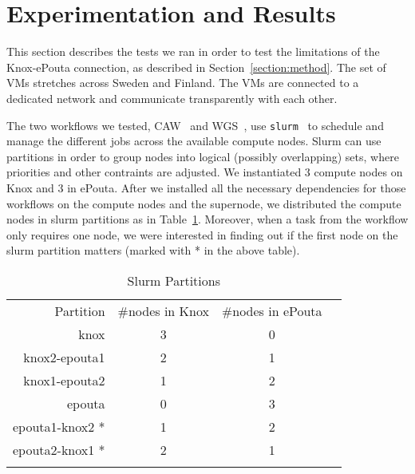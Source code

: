 \section{Experimentation and Results}
\label{section:experiments}

This section describes the tests we ran in order to test the
limitations of the Knox-ePouta connection, as described in
Section~\ref{section:method}.
%
The set of VMs stretches across Sweden and Finland. The VMs are
connected to a dedicated network and communicate transparently with
each other.


The two workflows we tested, CAW~\cite{caw} and WGS~\cite{wgs}, use
\texttt{slurm}~\cite{slurm} to schedule and manage the different jobs
across the available compute nodes.
%
Slurm can use partitions in order to group nodes into logical
(possibly overlapping) sets, where priorities and other contraints are
adjusted.
%
We instantiated 3 compute nodes on Knox and 3 in ePouta. After we
installed all the necessary dependencies for those workflows on the
compute nodes and the supernode, we distributed the compute nodes in
slurm partitions as in Table~\ref{experiments:slurm:partitions}.
%
Moreover, when a task from the workflow only requires one node, we were
interested in finding out if the first node on the slurm partition
matters (marked with * in the above table).

\begin{table}[ht]%
\caption{Slurm Partitions}
\label{experiments:slurm:partitions}
\centering
\begin{tabular}{|r||c|c|l|}\hhline{*{3}{=}}
Partition       & \#nodes in Knox & \#nodes in ePouta \\\hhline{*{3}{=}}
knox            & 3               & 0                 \\
knox2-epouta1   & 2               & 1                 \\
knox1-epouta2   & 1               & 2                 \\
epouta          & 0               & 3                 \\\hline
epouta1-knox2 * & 1               & 2                 \\
epouta2-knox1 * & 2               & 1                 \\\hhline{*{3}{=}}
\multicolumn{3}{l}{\scriptsize * epouta nodes first in the slurm partition}\\
\end{tabular}
\end{table}


